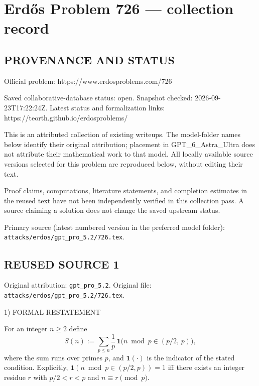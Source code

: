 \section*{Erd\H{o}s Problem 726 --- collection record}

\subsection*{PROVENANCE AND STATUS}
Official problem: https://www.erdosproblems.com/726

Saved collaborative-database status: open.
Snapshot checked: 2026-09-23T17:22:24Z.
Latest status and formalization links: https://teorth.github.io/erdosproblems/

This is an attributed collection of existing writeups. The model-folder names below identify their original attribution; placement in GPT\_6\_Astra\_Ultra does not attribute their mathematical work to that model. All locally available source versions selected for this problem are reproduced below, without editing their text.

Proof claims, computations, literature statements, and completion estimates in the reused text have not been independently verified in this collection pass. A source claiming a solution does not change the saved upstream status.

Primary source (latest numbered version in the preferred model folder): \texttt{attacks/erdos/gpt\_pro\_5.2/726.tex}.

\subsection*{REUSED SOURCE 1}
Original attribution: \texttt{gpt\_pro\_5.2}.
Original file: \texttt{attacks/erdos/gpt\_pro\_5.2/726.tex}.


1) FORMAL RESTATEMENT

For an integer $n\ge 2$ define
\[
S(n) := \sum_{p\le n} \frac{1}{p}\,\mathbf 1\big( n\bmod p \in (p/2,\,p)\big),
\]
where the sum runs over primes $p$, and $\mathbf 1(\cdot)$ is the indicator of the stated condition.
Explicitly, $\mathbf 1(n\bmod p\in(p/2,p))=1$ iff there exists an integer residue $r$ with $p/2<r<p$ and $n\equiv r\pmod p$.


